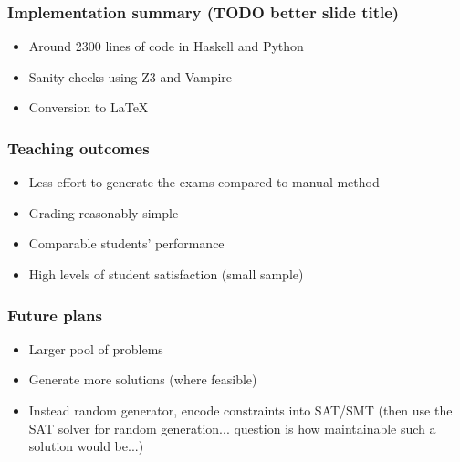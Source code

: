 \documentclass[xcolor={table}]{beamer}
\begin{document}


\begin{frame}
\frametitle{Implementation summary (TODO better slide title)}
\begin{itemize}
\item Around 2300 lines of code in Haskell and Python
\item Sanity checks using Z3 and Vampire
\item Conversion to \LaTeX
\end{itemize}
\end{frame}



\begin{frame}
\frametitle{Teaching outcomes}
\begin{itemize}
\item Less effort to generate the exams compared to manual method
\item Grading reasonably simple
\item Comparable students' performance
\item High levels of student satisfaction (small sample)
\end{itemize}
\end{frame}



\begin{frame}
\frametitle{Future plans}
\begin{itemize}
    \item Larger pool of problems
    \item Generate more solutions (where feasible)
    \item Instead random generator, encode constraints into SAT/SMT
            (then use the SAT solver for random generation... question is how maintainable such a solution would be...)
\end{itemize}
\end{frame}

\end{document}
